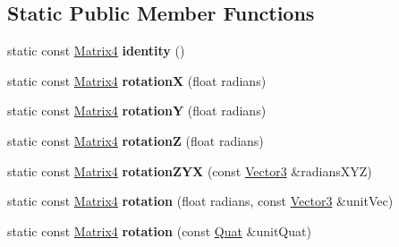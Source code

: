 \subsection*{Static Public Member Functions}
\begin{DoxyCompactItemize}
\item 
\mbox{\label{classVectormath_1_1Aos_1_1Matrix4_aa659272cb0a315edf33d555d47f77af3}} 
static const \hyperlink{classVectormath_1_1Aos_1_1Matrix4}{Matrix4} {\bfseries identity} ()
\item 
\mbox{\label{classVectormath_1_1Aos_1_1Matrix4_a91a927604ade04a7f3017a52b72a383e}} 
static const \hyperlink{classVectormath_1_1Aos_1_1Matrix4}{Matrix4} {\bfseries rotationX} (float radians)
\item 
\mbox{\label{classVectormath_1_1Aos_1_1Matrix4_a8ff703dd45a1dc4ad90e144289d3b9fa}} 
static const \hyperlink{classVectormath_1_1Aos_1_1Matrix4}{Matrix4} {\bfseries rotationY} (float radians)
\item 
\mbox{\label{classVectormath_1_1Aos_1_1Matrix4_a720bd6019bd6cc5e7afc35c248c168be}} 
static const \hyperlink{classVectormath_1_1Aos_1_1Matrix4}{Matrix4} {\bfseries rotationZ} (float radians)
\item 
\mbox{\label{classVectormath_1_1Aos_1_1Matrix4_a1245260423ddc440d5936888c391b478}} 
static const \hyperlink{classVectormath_1_1Aos_1_1Matrix4}{Matrix4} {\bfseries rotation\+Z\+YX} (const \hyperlink{classVectormath_1_1Aos_1_1Vector3}{Vector3} \&radians\+X\+YZ)
\item 
\mbox{\label{classVectormath_1_1Aos_1_1Matrix4_ad84115812d4267841fefccf93aed4630}} 
static const \hyperlink{classVectormath_1_1Aos_1_1Matrix4}{Matrix4} {\bfseries rotation} (float radians, const \hyperlink{classVectormath_1_1Aos_1_1Vector3}{Vector3} \&unit\+Vec)
\item 
\mbox{\label{classVectormath_1_1Aos_1_1Matrix4_a5db9f047ae5d50eec996ef40337871b4}} 
static const \hyperlink{classVectormath_1_1Aos_1_1Matrix4}{Matrix4} {\bfseries rotation} (const \hyperlink{classVectormath_1_1Aos_1_1Quat}{Quat} \&unit\+Quat)

\end{DoxyCompactItemize}
